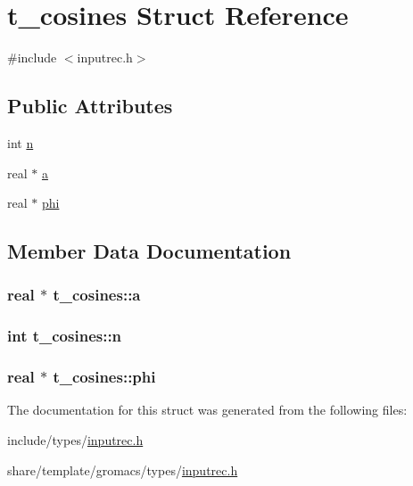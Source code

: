\hypertarget{structt__cosines}{\section{t\-\_\-cosines \-Struct \-Reference}
\label{structt__cosines}
}


{\ttfamily \#include $<$inputrec.\-h$>$}

\subsection*{\-Public \-Attributes}
\begin{DoxyCompactItemize}
\item 
int \hyperlink{structt__cosines_a287a92f24c78508a69d4118a132fcba3}{n}
\item 
real $\ast$ \hyperlink{structt__cosines_a2a65231bf3cd79fefbe13747cdaf8cc2}{a}
\item 
real $\ast$ \hyperlink{structt__cosines_a26ee787b9b7a9f020500167c7dda72b8}{phi}
\end{DoxyCompactItemize}


\subsection{\-Member \-Data \-Documentation}
\hypertarget{structt__cosines_a2a65231bf3cd79fefbe13747cdaf8cc2}{
\subsubsection[{a}]{\setlength{\rightskip}{0pt plus 5cm}real $\ast$ {\bf t\-\_\-cosines\-::a}}}\label{structt__cosines_a2a65231bf3cd79fefbe13747cdaf8cc2}
\hypertarget{structt__cosines_a287a92f24c78508a69d4118a132fcba3}{
\subsubsection[{n}]{\setlength{\rightskip}{0pt plus 5cm}int {\bf t\-\_\-cosines\-::n}}}\label{structt__cosines_a287a92f24c78508a69d4118a132fcba3}
\hypertarget{structt__cosines_a26ee787b9b7a9f020500167c7dda72b8}{
\subsubsection[{phi}]{\setlength{\rightskip}{0pt plus 5cm}real $\ast$ {\bf t\-\_\-cosines\-::phi}}}\label{structt__cosines_a26ee787b9b7a9f020500167c7dda72b8}


\-The documentation for this struct was generated from the following files\-:\begin{DoxyCompactItemize}
\item 
include/types/\hyperlink{include_2types_2inputrec_8h}{inputrec.\-h}\item 
share/template/gromacs/types/\hyperlink{share_2template_2gromacs_2types_2inputrec_8h}{inputrec.\-h}\end{DoxyCompactItemize}
